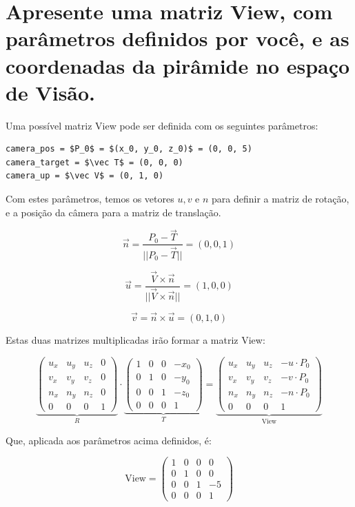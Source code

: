 \documentclass{article}
\begin{document}
\section{Apresente uma matriz View, com parâmetros definidos por você, e as coordenadas da pirâmide no espaço de Visão.}

Uma possível matriz View pode ser definida com os seguintes parâmetros:

\begin{lstlisting}
camera_pos = $P_0$ = $(x_0, y_0, z_0)$ = (0, 0, 5)
camera_target = $\vec T$ = (0, 0, 0)
camera_up = $\vec V$ = (0, 1, 0)
\end{lstlisting}

Com estes parâmetros, temos os vetores $u, v$ e $n$ para definir a matriz de rotação, e a posição da câmera para a matriz de translação.

$$\vec n = \frac{P_0 - \vec T}{||P_0 - \vec T||} = (0, 0, 1)$$

$$\vec u = \frac{\vec V \times \vec n}{||\vec V \times \vec n||} = (1, 0, 0)$$

$$\vec v = \vec n \times \vec u = (0, 1, 0)$$

Estas duas matrizes multiplicadas irão formar a matriz View:

$$
\underbrace{\begin{pmatrix}
u_x & u_y & u_z & 0\\
v_x & v_y & v_z & 0\\
n_x & n_y & n_z & 0\\
0 & 0 & 0 & 1
\end{pmatrix}}_{R} \cdot
\underbrace{\begin{pmatrix}
1 & 0 & 0 & -x_0\\
0 & 1 & 0 & -y_0\\
0 & 0 & 1 & -z_0\\
0 & 0 & 0 & 1
\end{pmatrix}}_{T} = 
\underbrace{\begin{pmatrix}
u_x & u_y & u_z & -u \cdot P_0\\
v_x & v_y & v_z & -v \cdot P_0\\
n_x & n_y & n_z & -n \cdot P_0\\
0 & 0 & 0 & 1
\end{pmatrix}}_{\text{View}}
$$

Que, aplicada aos parâmetros acima definidos, é:

$$\text{View} = \begin{pmatrix}
1 & 0 & 0 & 0\\
0 & 1 & 0 & 0\\
0 & 0 & 1 & -5\\
0 & 0 & 0 & 1
\end{pmatrix}$$
\end{document}
